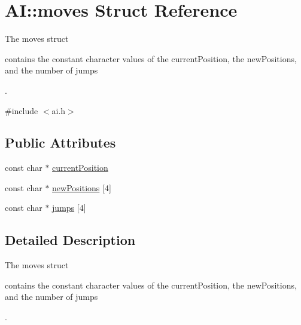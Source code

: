 \hypertarget{struct_a_i_1_1moves}{\section{A\-I\-:\-:moves Struct Reference}
\label{struct_a_i_1_1moves}
}


The moves struct \begin{DoxyVerb} contains the constant character values of the currentPosition, the newPositions, and the number of jumps\end{DoxyVerb}
.  




{\ttfamily \#include $<$ai.\-h$>$}

\subsection*{Public Attributes}
\begin{DoxyCompactItemize}
\item 
const char $\ast$ \hyperlink{struct_a_i_1_1moves_a736739fad02c378d6fd467d5eaf0926d}{current\-Position}
\item 
const char $\ast$ \hyperlink{struct_a_i_1_1moves_a1a70af16b28de0cb7d83c07b6663c647}{new\-Positions} \mbox{[}4\mbox{]}
\item 
const char $\ast$ \hyperlink{struct_a_i_1_1moves_a243ff8ab759ff66204e2d2152851fa65}{jumps} \mbox{[}4\mbox{]}
\end{DoxyCompactItemize}


\subsection{Detailed Description}
The moves struct \begin{DoxyVerb} contains the constant character values of the currentPosition, the newPositions, and the number of jumps\end{DoxyVerb}
. 

